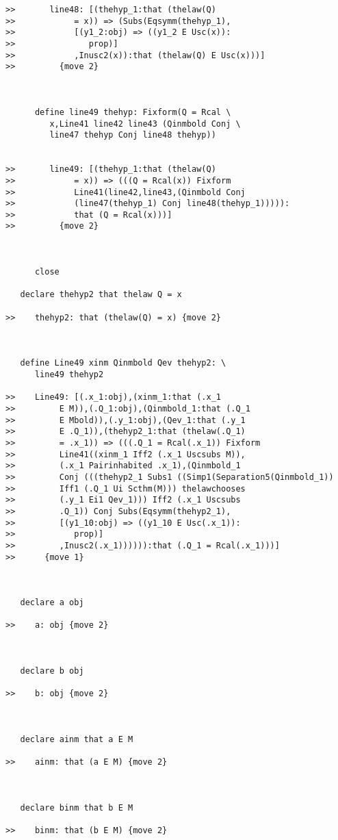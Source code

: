 \documentclass[12pt]{article}
\begin{document}
\begin{verbatim}
>>       line48: [(thehyp_1:that (thelaw(Q)
>>            = x)) => (Subs(Eqsymm(thehyp_1),
>>            [(y1_2:obj) => ((y1_2 E Usc(x)):
>>               prop)]
>>            ,Inusc2(x)):that (thelaw(Q) E Usc(x)))]
>>         {move 2}



      define line49 thehyp: Fixform(Q = Rcal \
         x,Line41 line42 line43 (Qinmbold Conj \
         line47 thehyp Conj line48 thehyp))


>>       line49: [(thehyp_1:that (thelaw(Q)
>>            = x)) => (((Q = Rcal(x)) Fixform
>>            Line41(line42,line43,(Qinmbold Conj
>>            (line47(thehyp_1) Conj line48(thehyp_1))))):
>>            that (Q = Rcal(x)))]
>>         {move 2}



      close

   declare thehyp2 that thelaw Q = x

>>    thehyp2: that (thelaw(Q) = x) {move 2}



   define Line49 xinm Qinmbold Qev thehyp2: \
      line49 thehyp2

>>    Line49: [(.x_1:obj),(xinm_1:that (.x_1
>>         E M)),(.Q_1:obj),(Qinmbold_1:that (.Q_1
>>         E Mbold)),(.y_1:obj),(Qev_1:that (.y_1
>>         E .Q_1)),(thehyp2_1:that (thelaw(.Q_1)
>>         = .x_1)) => (((.Q_1 = Rcal(.x_1)) Fixform
>>         Line41((xinm_1 Iff2 (.x_1 Uscsubs M)),
>>         (.x_1 Pairinhabited .x_1),(Qinmbold_1
>>         Conj (((thehyp2_1 Subs1 ((Simp1(Separation5(Qinmbold_1))
>>         Iff1 (.Q_1 Ui Scthm(M))) thelawchooses
>>         (.y_1 Ei1 Qev_1))) Iff2 (.x_1 Uscsubs
>>         .Q_1)) Conj Subs(Eqsymm(thehyp2_1),
>>         [(y1_10:obj) => ((y1_10 E Usc(.x_1)):
>>            prop)]
>>         ,Inusc2(.x_1)))))):that (.Q_1 = Rcal(.x_1)))]
>>      {move 1}



   declare a obj

>>    a: obj {move 2}



   declare b obj

>>    b: obj {move 2}



   declare ainm that a E M

>>    ainm: that (a E M) {move 2}



   declare binm that b E M

>>    binm: that (b E M) {move 2}




\end{verbatim}
\end{document}
